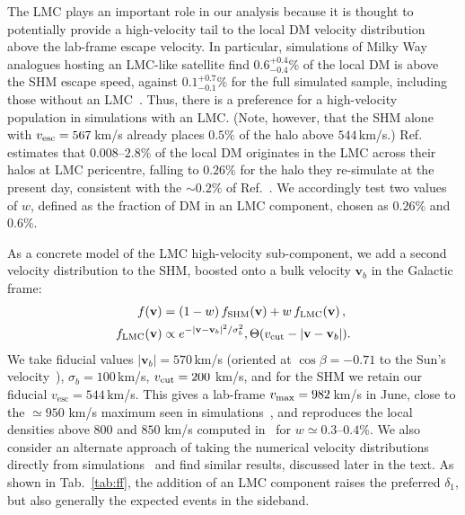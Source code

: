 \documentclass[reprint,superscriptaddress,preprintnumbers,amsmath,amssymb,aps,prd,tightenlines,longbibliography,nofootinbib]{revtex4-2}
\def\trs#1{{\color{blue}{ [#1 -- TRS] }}}
\begin{document}
The LMC plays an important role in our analysis because it is thought to potentially provide a high-velocity tail to the local DM velocity distribution above the lab-frame escape velocity. 
In particular, simulations of Milky Way analogues hosting an LMC-like satellite find
$0.6^{+0.4}_{-0.4}\%$ of the local DM is above the SHM escape speed, against $0.1^{+0.7}_{-0.1}\%$ for the full simulated
sample, including those without an LMC~\cite{Folsom:2025lly}. Thus, there is a preference for a high-velocity population in simulations with an LMC.
(Note, however, that the SHM alone with $v_{\rm esc} = 567$\,km/s already places $0.5\%$ of the halo above $544$\,km/s.) 
Ref.~\cite{Smith-Orlik:2023kyu}
estimates that $0.008$--$2.8\%$ of the local DM originates in the LMC across their halos at LMC pericentre, falling to $0.26\%$ for the halo they re-simulate at the present day, consistent with the $\sim\!0.2\%$ of Ref.~\cite{Besla:2019xbx}. We accordingly test two values of $w$, defined as the fraction of DM in an LMC component, chosen as $0.26\%$ and $0.6\%$.

As a concrete model of the LMC high-velocity sub-component, we add a second velocity distribution to the SHM, boosted onto a bulk velocity $\mathbf{v}_b$ in the Galactic frame:
\begin{equation}
\begin{split}
f(\mathbf{v}) &= (1-w)\, f_{\rm SHM}(\mathbf{v}) + w\, f_{\rm LMC}(\mathbf{v}) \,, \\
f_{\rm LMC}(\mathbf{v}) &\propto e^{-|\mathbf{v}-\mathbf{v}_b|^2/\sigma_b^2},
\Theta\!\left(v_{\rm cut} - |\mathbf{v}-\mathbf{v}_b|\right)\!.
\end{split}
\label{eq:mix}
\end{equation}
We take fiducial values $|\mathbf{v}_b| = 570$\,km/s (oriented at $\cos\beta = -0.71$ to the Sun's velocity~\cite{Besla:2019xbx,Smith-Orlik:2023kyu}), $\sigma_b = 100$\,km/s, $v_{\rm cut} = 200$ km/s, and for the SHM we retain our fiducial $v_\textrm{esc} = 544$\,km/s. This gives a lab-frame $v_{\rm max} = 982$\,km/s in June, close to the $\simeq\!950$ km/s maximum seen in simulations~\cite{Smith-Orlik:2023kyu}, and reproduces the local densities above $800$ and $850$ km/s computed in~\cite{Besla:2019xbx} for $w \simeq 0.3$--$0.4\%$. 
We also consider an alternate approach of taking the numerical velocity distributions directly from simulations~\cite{Smith-Orlik:2023kyu} and find similar results, discussed later in the text.
As shown in Tab.~\ref{tab:ff}, the addition of an LMC component raises the preferred $\delta_1$, but also generally the expected events in the sideband.
\end{document}
